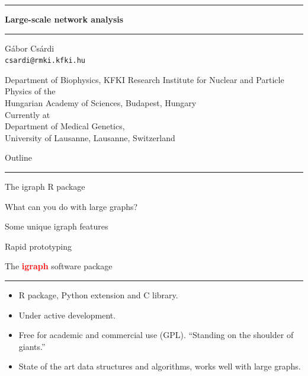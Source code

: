 \documentclass[landscape,fleqno]{foils}
\newcommand{\stitle}[1]{{\color{blue}\Large #1\par\vspace*{10pt}\hrule}}
\renewcommand{\emph}[1]{\textcolor{red}{\bf #1}}
\begin{document}
\RaggedRight


\thispagestyle{empty}
\vspace*{1cm}
{\centering
\hrule
\Large
\vspace*{1cm}
{\bf Large-scale network analysis}
\vspace*{1cm}
\par
\hrule
\par
\vspace*{2cm}
\normalsize G\'abor Cs\'ardi\\
\small \verb+csardi@rmki.kfki.hu+
\par
\vspace*{1.5cm}
Department of Biophysics, 
KFKI Research Institute for Nuclear and Particle Physics of the\\
Hungarian Academy of Sciences, Budapest, Hungary\\[15pt]
Currently at \\Department of Medical Genetics, \\
University of Lausanne, Lausanne, Switzerland\\
}

\newpage
\stitle{Outline}

\begin{enumerate}
{\centering
\item The igraph R package\par
\item What can you do with large graphs?\par
\item Some unique igraph features\par
\item Rapid prototyping\par
}
\end{enumerate}

\newpage
\stitle{The \emph{igraph} software package}

\begin{itemize}
\item R package, Python extension and C library. \pause
\item Under active development. \pause
\item Free for academic and commercial use (GPL). ``Standing on the
  shoulder of giants.'' \pause
\item State of the art data structures and algorithms, works well with
  large graphs.
\end{itemize}
\end{document}
